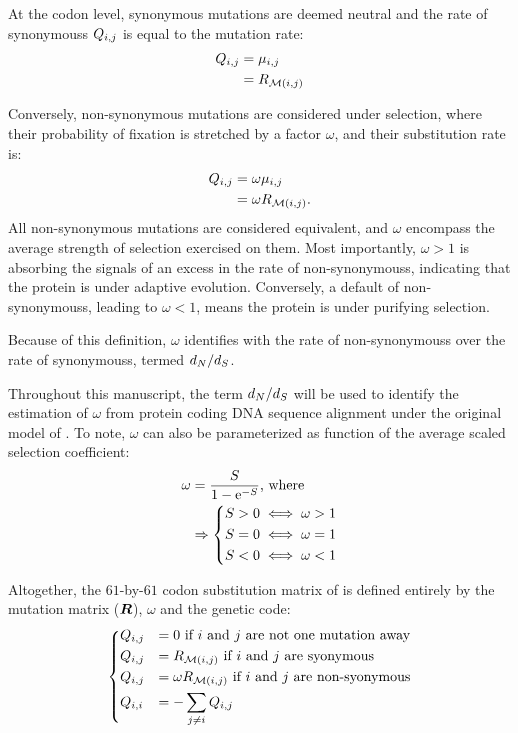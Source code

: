 At the \gls{codon} level, synonymous mutations are deemed \gls{neutral} and the rate of \glspl{synonymous} ${Q_{{i}, {j}}}$ is equal to the mutation rate: 
\begin{align}
Q_{{i}, {j}} & = \mu_{{i}, {j}} \\
				  & = R_{\mathcal{M}({i}, {j})}
\end{align}

Conversely, non-synonymous mutations are considered under selection, where their probability of fixation is stretched by a factor $\omega$, and their \gls{substitution} rate is:
\begin{align}
Q_{{i}, {j}} & = \omega \mu_{{i}, {j}} \\
					& = \omega R_{\mathcal{M}({i}, {j})}.
\end{align}
All non-synonymous mutations are considered equivalent, and $\omega$ encompass the average strength of selection exercised on them.
Most importantly, $\omega>1$ is absorbing the signals of an excess in the rate of \glspl{non-synonymous}, indicating that the protein is under adaptive evolution.
Conversely, a default of \glspl{non-synonymous}, leading to $\omega<1$, means the protein is under purifying selection.


Because of this definition, $\omega$ identifies with the rate of \glspl{non-synonymous} over the rate of \glspl{synonymous}, termed $d_N / d_S$.

Throughout this manuscript, the term $d_N / d_S$ will be used to identify the estimation of $\omega$ from protein coding \acrshort{DNA} sequence alignment under the original model of \citet{Muse1994}.
To note, $\omega$ can also be parameterized as function of the average scaled selection coefficient:
\begin{align}
\omega & = \dfrac{S}{1 - \mathrm{e}^{-S}} \text{, where }\\
& \Rightarrow	\begin{dcases}
	S > 0 \iff \omega > 1 \\
	S = 0 \iff \omega = 1 \\
	S < 0 \iff \omega < 1
	\end{dcases}
\end{align}

Altogether, the $61$-by-$61$ \gls{codon} \gls{substitution} matrix of \citet{Muse1994} is defined entirely by the mutation matrix ($\bm{R}$), $\omega$ and the genetic code:
\begin{equation}
\begin{dcases}
Q_{{i}, {j}} & = 0 \text{ if ${i}$ and ${j}$ are not one mutation away} \\
Q_{{i}, {j}} & = R_{\mathcal{M}({i}, {j})} \text{ if ${i}$ and ${j}$ are syonymous} \\
Q_{{i}, {j}} & = \omega R_{\mathcal{M}({i}, {j})} \text{ if ${i}$ and ${j}$ are non-syonymous} \\
Q_{{i}, {i}} & = - \sum_{{j} \neq {i}} Q_{{i}, {j}}
\end{dcases}
\label{eq:codon-models}
\end{equation}

